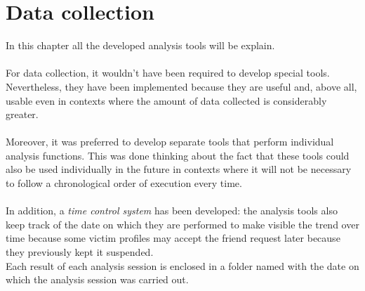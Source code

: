 
\chapter{Data collection}
\label{cap:data-collection}
In this chapter all the developed analysis tools will be explain.
\\\\For data collection, it wouldn't have been required to develop special tools.
Nevertheless, they have been implemented because they are useful and, above all, usable even in contexts where the amount of data collected is considerably greater.\\\\
Moreover, it was preferred to develop separate tools that perform individual analysis functions. This was done thinking about the fact that these tools could also be used individually in the future in contexts where it will not be necessary to follow a chronological order of execution every time.
\\\\
In addition, a \textit{time control system} has been developed: the analysis tools also keep track of the date on which they are performed to make visible the trend over time because some victim profiles may accept the friend request later because they previously kept it suspended.\\ Each result of each analysis session is enclosed in a folder named with the date on which the analysis session was carried out.

